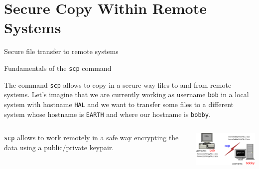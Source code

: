 \section{Secure Copy Within Remote Systems}
\begin{frame}[t,fragile]{Secure file transfer to remote systems}
  \begin{block}{Fundamentals of the \alert{\texttt{scp}} command}
    {\footnotesize
      The command \alert{\texttt{scp}}  allows to copy in a secure way files to and from remote systems. Let's imagine that we are currently working as username \texttt{\alert{bob}} in a local system with hostname \texttt{HAL} and we want to transfer some files to a different system whose hostname is \texttt{EARTH} and where our hostname is \texttt{\alert{bobby}}.  

  \begin{columns}
      \texttt{\alert{scp}} allows to work remotely in a safe way encrypting the data using a \alert{public/private keypair}.

\begin{center}
\includegraphics[angle=0,width=5cm]{./Figs/Diagram4.eps}%
\end{center}
\end{columns}
}
  \end{block}
  
\end{frame}
